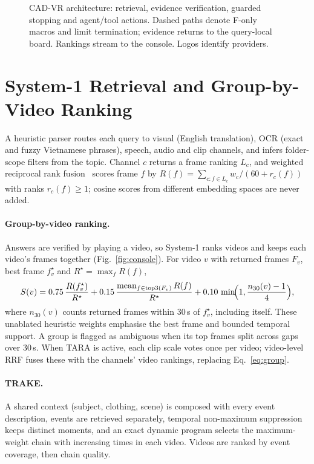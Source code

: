 \documentclass[runningheads]{llncs}
\begin{document}
\begin{figure}[t]
\centering
\resizebox{\textwidth}{!}{}
\caption{CAD-VR architecture: retrieval, evidence verification, guarded stopping and agent/tool actions. Dashed paths denote F-only macros and limit termination; evidence returns to the query-local board. Rankings stream to the console. Logos identify providers.}
\label{fig:architecture}
\end{figure}

\section{System-1 Retrieval and Group-by-Video Ranking}
\label{sec:system1}
A heuristic parser routes each query to visual (English translation), OCR (exact and fuzzy Vietnamese phrases), speech, audio and clip channels, and infers folder-scope filters from the topic. Channel $c$ returns a frame ranking $L_c$, and weighted reciprocal rank fusion~\cite{rrf2009} scores frame $f$ by $R(f)=\sum_{c:f\in L_c}w_c/(60+r_c(f))$ with ranks $r_c(f)\geq1$; cosine scores from different embedding spaces are never added.

\paragraph{Group-by-video ranking.}
Answers are verified by playing a video, so System-1 ranks videos and keeps each video's frames together (Fig.~\ref{fig:console}). For video $v$ with returned frames $F_v$, best frame $f^\star_v$ and $R^\star=\max_f R(f)$,
\begin{equation}
S(v)=0.75\,\frac{R(f^\star_v)}{R^\star}+0.15\,\frac{\operatorname{mean}_{f\in\mathrm{top3}(F_v)}R(f)}{R^\star}+0.10\,\min\!\Bigl(1,\frac{n_{30}(v)-1}{4}\Bigr),
\label{eq:group}
\end{equation}
where $n_{30}(v)$ counts returned frames within 30\,s of $f^\star_v$, including itself. These unablated heuristic weights emphasise the best frame and bounded temporal support. A group is flagged as ambiguous when its top frames split across gaps over 30\,s. When TARA is active, each clip scale votes once per video; video-level RRF fuses these with the channels' video rankings, replacing Eq.~\eqref{eq:group}.

\paragraph{TRAKE.}
A shared context (subject, clothing, scene) is composed with every event description, events are retrieved separately, temporal non-maximum suppression keeps distinct moments, and an exact dynamic program selects the maximum-weight chain with increasing times in each video. Videos are ranked by event coverage, then chain quality.
\end{document}
